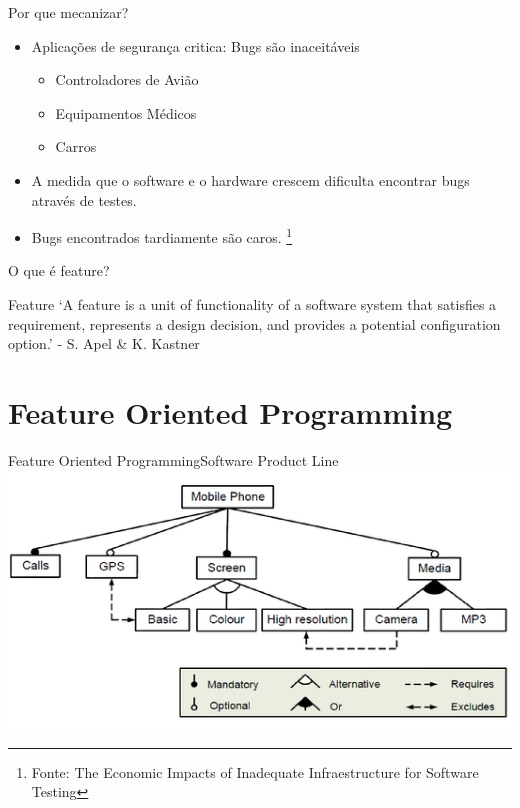 \documentclass{beamer}
\begin{document}
    \begin{frame}{Por que mecanizar?}
        \begin{itemize}
            \item Aplicações de segurança critica: Bugs são inaceitáveis
            \begin{itemize}
                \item Controladores de Avião
                \item Equipamentos Médicos
                \item Carros
            \end{itemize}
        \item<2-> A medida que o software e o hardware crescem dificulta encontrar
            bugs através de testes.
        \item<3-> Bugs encontrados tardiamente são caros.
            \footnote{Fonte: The Economic Impacts of Inadequate Infraestructure for Software Testing}
        \end{itemize}
    \end{frame}



    \begin{frame}{O que é feature?}
        \centering
        \begin{block}{Feature}
            `A feature is a unit of functionality of a software system
            that satisfies a requirement, represents a design decision, and provides a potential
            configuration option.' - S. Apel \& K. Kastner
        \end{block}
    \end{frame}

    \section{Feature Oriented Programming}
    \begin{frame}{Feature Oriented Programming}{Software Product Line}
        \includegraphics[width=\textwidth]{spl-ex}
    \end{frame}
\end{document}
